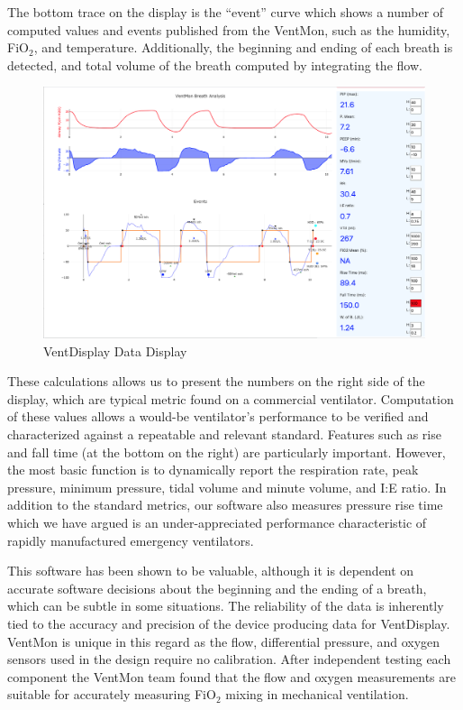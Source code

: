 \documentclass[11pt, letterpaper]{article}
\begin{document}
The bottom trace on the display is the ``event'' curve which shows a number of computed values and events published from the VentMon, such as the humidity, FiO$_2$, and temperature. Additionally, the beginning and ending of each breath is detected, and total volume of the breath computed by integrating the flow. 


\begin{figure}[H]
\centering
\includegraphics[width=\textwidth]{images/VentDisplayExample.png}
\caption{VentDisplay Data Display}
\label{fig:ventdisplay}
\end{figure}

These calculations allows us to present the numbers on the right side of the display, which are typical metric found on a commercial ventilator. Computation of these values allows a would-be ventilator's performance to be verified and characterized against a repeatable and relevant standard. Features such as rise and fall time (at the bottom on the right) are particularly important. However, the most basic function is to dynamically report the respiration rate, peak pressure, minimum pressure, tidal volume and minute volume, and I:E ratio. In addition to the standard metrics, our software also measures pressure rise time which we have argued is an under-appreciated performance characteristic of rapidly manufactured emergency ventilators\cite{schulz2020importance}.

This software has been shown to be valuable, although it is dependent on accurate software decisions about
the beginning and the ending of a breath, which can be subtle in some situations. The reliability of the data is inherently tied to the accuracy and precision of the device producing data for VentDisplay. VentMon is unique in this regard as the flow, differential pressure, and oxygen sensors used in the design require no calibration. After independent testing each component the VentMon team found that the flow and oxygen measurements are suitable for accurately measuring FiO$_2$ mixing in mechanical ventilation.
\end{document}
